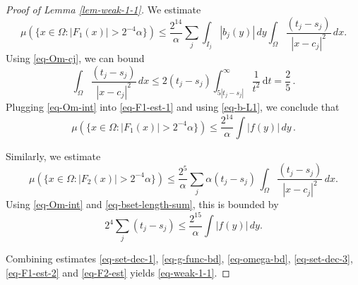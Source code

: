 {\begin{proof}[Proof of Lemma \ref{lem-weak-1-1}]
We estimate
\begin{equation}
    \label{eq-F1-est-1}
    \mu(\{x\in \Omega: |F_1(x)|> 2^{-4}\alpha\})\leq \frac{2^{14}}{\alpha}\sum_{j} \int_{I_j} |b_j(y)|\, dy\int_{\Omega}  \frac{(t_j-s_j)}{|x-c_j|^2}\, dx.
\end{equation}
Using \eqref{eq-Om-cj}, we can bound
\begin{equation}
    \label{eq-Om-int}
    \int_{\Omega}  \frac{(t_j-s_j)}{|x-c_j|^2}\, dx \le 2(t_j - s_j) \int_{5|t_j - s_j|}^\infty  \frac{1}{t^2} \, \mathrm{d}t = \frac{2}{5}\,.
\end{equation}
Plugging \eqref{eq-Om-int} into \eqref{eq-F1-est-1} and using \eqref{eq-b-L1}, we conclude that
\begin{equation}
    \label{eq-F1-est-2}
    \mu(\{x\in \Omega: |F_1(x)|>2^{-4}\alpha\})\leq \frac{2^{14}}{\alpha}\int |f(y)|\,dy\,.
\end{equation}

Similarly, we estimate
$$\mu(\{x\in \Omega: |F_2(x)|>2^{-4} \alpha\})\leq \frac{2^{5}}{\alpha}\sum_{j} \alpha (t_j-s_j)\, \int_{\Omega}  \frac{(t_j-s_j)}{|x-c_j|^2}\, dx.$$
Using \eqref{eq-Om-int} and \eqref{eq-bset-length-sum}, this is bounded by
\begin{equation}
\label{eq-F2-est}
2^{4}\sum_{j} (t_j-s_j)\leq \frac{2^{15}}{\alpha}\int |f(y)|\, dy.
\end{equation}

Combining estimates \eqref{eq-set-dec-1}, \eqref{eq-g-func-bd}, \eqref{eq-omega-bd}, \eqref{eq-set-dec-3}, \eqref{eq-F1-est-2} and \eqref{eq-F2-est} yields \eqref{eq-weak-1-1}.
\end{proof}
















































}
